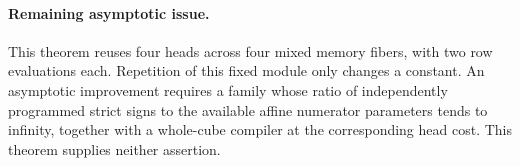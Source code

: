 \documentclass[11pt]{article}
\begin{document}
\paragraph{Remaining asymptotic issue.}
This theorem reuses four heads across four mixed memory fibers,
with two row evaluations each. Repetition of this fixed module
only changes a constant. An asymptotic improvement requires a
family whose ratio of independently programmed strict signs to
the available affine numerator parameters tends to infinity,
together with a whole-cube compiler at the corresponding head
cost. This theorem supplies neither assertion.
\end{document}
